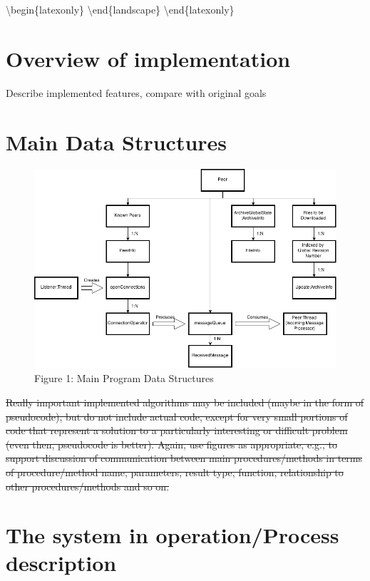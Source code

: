 \documentclass[12pt,a4paper,]{adreport}
\begin{document}
\textbackslash{}begin\{latexonly\} \textbackslash{}end\{landscape\}
\textbackslash{}end\{latexonly\}

\section{Overview of implementation}\label{overview-of-implementation}

Describe implemented features, compare with original goals

\section{Main Data Structures}\label{main-data-structures}

\begin{figure}[htbp]
\centering
\includegraphics{strucs.png}
\caption{Figure 1: Main Program Data Structures}
\end{figure}

\sout{Really important implemented algorithms may be included (maybe in
the form of pseudocode), but do not include actual code, except for very
small portions of code that represent a solution to a particularly
interesting or difficult problem (even then, pseudocode is better).
Again, use figures as appropriate, e.g., to support discussion of
communication between main procedures/methods in terms of
procedure/method name, parameters, result type, function, relationship
to other procedures/methods and so on.}

\section{The system in operation/Process
description}\label{the-system-in-operationprocess-description}
\end{document}
